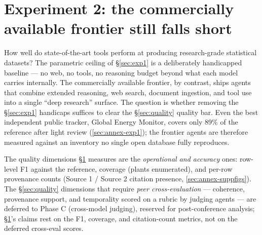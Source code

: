 \documentclass[a4paper,11pt]{article}
\begin{document}
\section{Experiment 2: the commercially available frontier still falls
short}\label{sec:exp2}

How well do state-of-the-art tools perform at producing research-grade
statistical datasets? The parametric ceiling of §\ref{sec:exp1} is a
deliberately handicapped baseline --- no web, no tools, no reasoning
budget beyond what each model carries internally. The commercially
available frontier, by contrast, ships agents that combine extended
reasoning, web search, document ingestion, and tool use into a single
``deep research'' surface. The question is whether removing the
§\ref{sec:exp1} handicaps suffices to clear the §\ref{sec:quality}
quality bar. Even the best independent public tracker, Global Energy
Monitor, covers only 89\% of the reference after light review
(\ref{sec:annex-exp1}); the frontier agents are therefore measured
against an inventory no single open database fully reproduces.

The quality dimensions §\ref{sec:exp2} measures are the
\emph{operational and accuracy} ones: row-level F1 against the
reference, coverage (plants enumerated), and per-row provenance counts
(Source 1 / Source 2 citation presence, \ref{sec:annex-suppfigs}). The
§\ref{sec:quality} dimensions that require \emph{peer cross-evaluation}
--- coherence, provenance support, and temporality scored on a rubric by
judging agents --- are deferred to Phase C (cross-model judging),
reserved for post-conference analysis; §\ref{sec:exp2}'s claims rest on
the F1, coverage, and citation-count metrics, not on the deferred
cross-eval scores.
\end{document}
